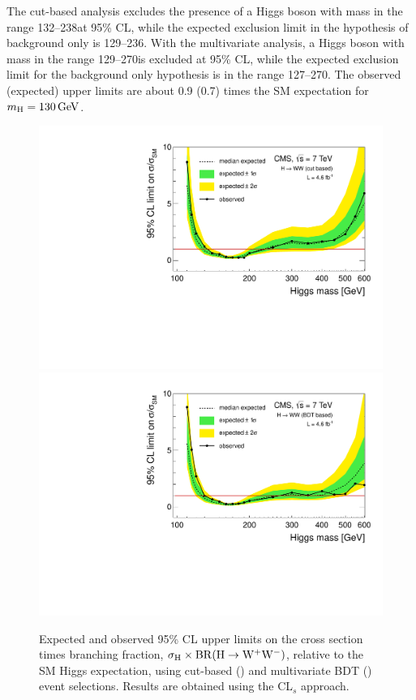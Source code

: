 \documentclass[11pt,twoside,a4paper,cmspaper,final,collab]{cms-tdr}
\begin{document}
The cut-based analysis excludes the presence of a Higgs boson
with mass in the range 132--238\GeV at 95\% CL, while the
expected exclusion limit in the hypothesis of background only
is 129--236\GeV. With the multivariate analysis,
a Higgs boson with mass in the range
129--270\GeV is excluded at 95\% CL, while the expected exclusion limit for the
background only hypothesis is in the range 127--270\GeV.
The observed (expected) upper limits are about 0.9 (0.7) times
the SM expectation for $m_{\mathrm{H}}=130\,\text{Ge\hspace{-.08em}V}$.



\begin{figure}[htbp]
  \begin{center}
   \includegraphics[width=\cmsFigWidth]{limits_nj_cut}
   \includegraphics[width=\cmsFigWidth]{limits_nj_shape}
    \caption{Expected and observed 95\% CL upper
       limits on the cross section times branching fraction,
       $\sigma_{\mathrm{H}} \times \mathrm{BR}(\mathrm{H} \to \mathrm{W^+}{}\mathrm{W^-})$,
       relative to the SM Higgs expectation, using cut-based (\cmsLeft) and
       multivariate BDT (\cmsRight) event selections. Results are obtained using the CL$_{s}$ approach.}
    \label{fig:xsLimCuts}
  \end{center}
\end{figure}
\end{document}
